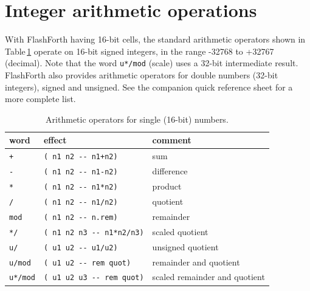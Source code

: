 \documentclass[12pt,a4paper]{article}
\begin{document}
\newpage
\section{Integer arithmetic operations}
\label{sec:arithmetic}
%
With FlashForth having 16-bit cells, the standard arithmetic operators 
shown in Table\,\ref{tab:arithmetic-operators}
operate on 16-bit signed integers, in the range -32768 to +32767 (decimal).
Note that the word \verb!u*/mod! (scale) uses a 32-bit intermediate result.
FlashForth also provides arithmetic operators 
for double numbers (32-bit integers), signed and unsigned.
See the companion quick reference sheet \cite{jacobs_2016b} for a more complete list.

\begin{table}[htb]
 \caption{Arithmetic operators for single (16-bit) numbers.}
 \label{tab:arithmetic-operators}
 \centering
 \begin{tabular}{lll}
  \hline
  word & effect & comment \\
  \hline
  \verb!+! & \verb!( n1 n2 -- n1+n2)! & sum \\
  \verb!-! & \verb!( n1 n2 -- n1-n2)! & difference \\
  \verb!*! & \verb!( n1 n2 -- n1*n2)! & product \\
  \verb!/! & \verb!( n1 n2 -- n1/n2)! & quotient \\
  \verb!mod! & \verb!( n1 n2 -- n.rem)! & remainder \\
  \verb!*/! & \verb!( n1 n2 n3 -- n1*n2/n3)! & scaled quotient \\
  \verb!u/! & \verb!( u1 u2 -- u1/u2)! & unsigned quotient \\
  \verb!u/mod! & \verb!( u1 u2 -- rem quot)! & remainder and quotient \\
  \verb!u*/mod! & \verb!( u1 u2 u3 -- rem quot)! & scaled remainder and quotient \\
  \hline
 \end{tabular}
\end{table}
\end{document}
